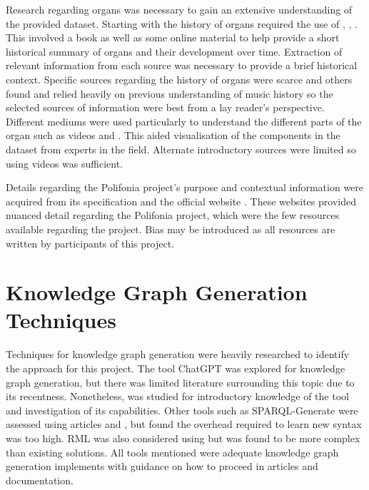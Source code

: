 Research regarding organs was necessary to gain an extensive understanding of the provided dataset. Starting with the history of organs required the use of \cite{organhistory}, \cite{organhistory1}, \cite{organmedivalhistory}. This involved a book as well as some online material to help provide a short historical summary of organs and their development over time. Extraction of relevant information from each source was necessary to provide a brief historical context. Specific sources regarding the history of organs were scarce and others found \cite{apel1948early} and \cite{ochse1988history} relied heavily on previous understanding of music history so the selected sources of information were best from a lay reader's perspective. Different mediums were used particularly to understand the different parts of the organ such as videos \cite{organvideo} and \cite{organvideo1}. This aided visualisation of the components in the dataset from experts in the field. Alternate introductory sources were limited so using videos was sufficient. 

Details regarding the Polifonia project's purpose and contextual information were acquired from its specification \cite{polifoniaproject} and the official website \cite{polifonia}. These websites provided nuanced detail regarding the Polifonia project, which were the few resources available regarding the project. Bias may be introduced as all resources are written by participants of this project. 

\section{Knowledge Graph Generation Techniques}
\hspace{0.5cm} Techniques for knowledge graph generation were heavily researched to identify the approach for this project. The tool ChatGPT \cite{chatgptwebsite} was explored for knowledge graph generation, but there was limited literature surrounding this topic due to its recentness. Nonetheless, \cite{chatgpt} was studied for introductory knowledge of the tool and investigation of its capabilities. Other tools such as SPARQL-Generate \cite{sparqlgenerate} were assessed using articles \cite{lefranccois2017flexible} and \cite{lefranccois2017sparql}, but found the overhead required to learn new syntax was too high. RML \cite{rml} was also considered using \cite{dimou2014rml} but was found to be more complex than existing solutions. All tools mentioned were adequate knowledge graph generation implements with guidance on how to proceed in articles and documentation. 

